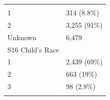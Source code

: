 \documentclass[]{article}
\begin{document}
\begin{longtable}[]{@{}ll@{}}
\begin{minipage}[t]{0.71\columnwidth}
\end{minipage} & \begin{minipage}[t]{0.23\columnwidth}\raggedright
\strut
\end{minipage}\tabularnewline
\begin{minipage}[t]{0.71\columnwidth}\raggedright
1\strut
\end{minipage} & \begin{minipage}[t]{0.23\columnwidth}\raggedright
314 (8.8\%)\strut
\end{minipage}\tabularnewline
\begin{minipage}[t]{0.71\columnwidth}\raggedright
2\strut
\end{minipage} & \begin{minipage}[t]{0.23\columnwidth}\raggedright
3,255 (91\%)\strut
\end{minipage}\tabularnewline
\begin{minipage}[t]{0.71\columnwidth}\raggedright
Unknown\strut
\end{minipage} & \begin{minipage}[t]{0.23\columnwidth}\raggedright
6,479\strut
\end{minipage}\tabularnewline
\begin{minipage}[t]{0.71\columnwidth}\raggedright
S16 Child's Race\strut
\end{minipage} & \begin{minipage}[t]{0.23\columnwidth}\raggedright
\strut
\end{minipage}\tabularnewline
\begin{minipage}[t]{0.71\columnwidth}\raggedright
1\strut
\end{minipage} & \begin{minipage}[t]{0.23\columnwidth}\raggedright
2,439 (69\%)\strut
\end{minipage}\tabularnewline
\begin{minipage}[t]{0.71\columnwidth}\raggedright
2\strut
\end{minipage} & \begin{minipage}[t]{0.23\columnwidth}\raggedright
663 (19\%)\strut
\end{minipage}\tabularnewline
\begin{minipage}[t]{0.71\columnwidth}\raggedright
3\strut
\end{minipage} & \begin{minipage}[t]{0.23\columnwidth}\raggedright
98 (2.8\%)\strut
\end{minipage}\tabularnewline
\begin{minipage}[t]{0.71\columnwidth}\raggedright

\end{minipage}
\end{longtable}
\end{document}

